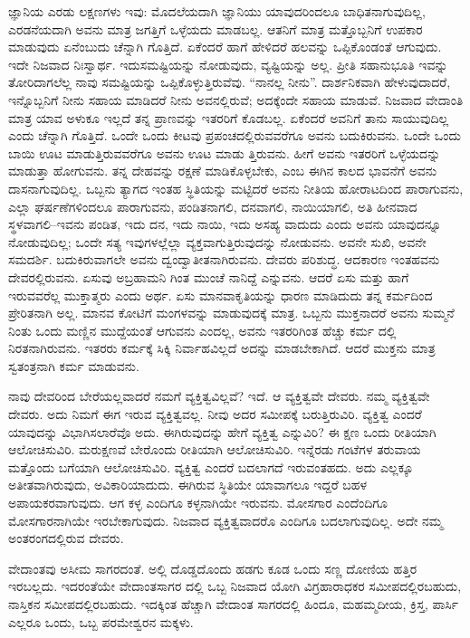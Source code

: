 ಜ್ಞಾನಿಯ ಎರಡು ಲಕ್ಷಣಗಳು ಇವು: ಮೊದಲೆಯದಾಗಿ ಜ್ಞಾನಿಯು ಯಾವುದರಿಂದಲೂ ಬಾಧಿತನಾಗುವುದಿಲ್ಲ, ಎರಡನೆಯದಾಗಿ ಅವನು ಮಾತ್ರ ಜಗತ್ತಿಗೆ ಒಳ್ಳೆಯದು ಮಾಡಬಲ್ಲ. ಆತನಿಗೆ ಮಾತ್ರ ಮತ್ತೊಬ್ಬನಿಗೆ ಉಪಕಾರ ಮಾಡುವುದು ಏನೆಂಬುದು ಚೆನ್ನಾಗಿ ಗೊತ್ತಿದೆ. ಏಕೆಂದರೆ ಹಾಗೆ ಹೇಳಿದರೆ ಹಲವನ್ನು ಒಪ್ಪಿಕೊಂಡಂತೆ ಆಗುವುದು. ಇದೇ ನಿಜವಾದ ನಿಃಸ್ವಾರ್ಥ. ಇದುಸಮಷ್ಟಿಯನ್ನು ನೋಡುವುದು, ವ್ಯಷ್ಟಿಯನ್ನು ಅಲ್ಲ. ಪ್ರೀತಿ ಸಹಾನುಭೂತಿ ಇವನ್ನು ತೋರಿದಾಗಲೆಲ್ಲ ನಾವು ಸಮಷ್ಟಿಯನ್ನು ಒಪ್ಪಿಕೊಳ್ಳುತ್ತಿರುವೆವು. “ನಾನಲ್ಲ ನೀನು”. ದಾರ್ಶನಿಕವಾಗಿ ಹೇಳುವುದಾದರೆ, ಇನ್ನೊಬ್ಬನಿಗೆ ನೀನು ಸಹಾಯ ಮಾಡಿದರೆ ನೀನು ಅವನಲ್ಲಿರುವೆ; ಅದಕ್ಕೆಂದೇ ಸಹಾಯ ಮಾಡುವೆ. ನಿಜವಾದ ವೇದಾಂತಿ ಮಾತ್ರ ಯಾವ ಅಳುಕೂ ಇಲ್ಲದೆ ತನ್ನ ಪ್ರಾಣವನ್ನು ಇತರರಿಗೆ ಕೊಡಬಲ್ಲ. ಏಕೆಂದರೆ ಅವನಿಗೆ ತಾನು ಸಾಯುವುದಿಲ್ಲ ಎಂದು ಚೆನ್ನಾಗಿ ಗೊತ್ತಿದೆ. ಒಂದೇ ಒಂದು ಕೀಟವು ಪ್ರಪಂಚದಲ್ಲಿರುವವರೆಗೂ ಅವನು ಬದುಕಿರುವನು. ಒಂದೇ ಒಂದು ಬಾಯಿ ಊಟ ಮಾಡುತ್ತಿರುವವರೆಗೂ ಅವನು ಊಟ ಮಾಡು ತ್ತಿರುವನು. ಹೀಗೆ ಅವನು ಇತರರಿಗೆ ಒಳ್ಳೆಯದನ್ನು ಮಾಡುತ್ತಾ ಹೋಗುವನು. ತನ್ನ ದೇಹವನ್ನು ರಕ್ಷಣೆ ಮಾಡಿಕೊಳ್ಳಬೇಕು, ಎಂಬ ಈಗಿನ ಕಾಲದ ಭಾವನೆಗೆ ಅವನು ದಾಸನಾಗುವುದಿಲ್ಲ. ಒಬ್ಬನು ತ್ಯಾಗದ ಇಂತಹ ಸ್ಥಿತಿಯನ್ನು ಮಟ್ಟಿದರೆ ಅವನು ನೀತಿಯ ಹೋರಾಟದಿಂದ ಪಾರಾಗುವನು, ಎಲ್ಲಾ ಘರ್ಷಣೆಗಳಿಂದಲೂ ಪಾರಾಗುವನು, ಪಂಡಿತನಾಗಲಿ, ದನವಾಗಲಿ, ನಾಯಿಯಾಗಲಿ, ಅತಿ ಹೀನವಾದ ಸ್ಥಳವಾಗಲಿ–ಇವನು ಪಂಡಿತ, ಇದು ದನ, ಇದು ನಾಯಿ, ಇದು ಅಸಹ್ಯ ವಾದುದು ಎಂದು ಅವನು ಯಾವುದನ್ನೂ ನೋಡುವುದಿಲ್ಲ; ಒಂದೇ ಸತ್ಯ ಇವುಗಳಲ್ಲೆಲ್ಲಾ ವ್ಯಕ್ತವಾಗುತ್ತಿರುವುದನ್ನು ನೋಡುವನು. ಅವನೇ ಸುಖಿ, ಅವನೇ ಸಮದರ್ಶಿ. ಬದುಕಿರುವಾಗಲೇ ಅವನು ದ್ವಂದ್ವಾತೀತನಾಗಿರುವನು. ದೇವರು ಪರಿಶುದ್ಧ. ಆದಕಾರಣ ಇಂತಹವನು ದೇವರಲ್ಲಿರುವನು. ಏಸುವು ಅಬ್ರಹಾಮನಿ ಗಿಂತ ಮುಂಚೆ ನಾನಿದ್ದೆ ಎನ್ನುವನು. ಆದರೆ ಏಸು ಮತ್ತು ಹಾಗೆ ಇರುವವರೆಲ್ಲ ಮುಕ್ತಾತ್ಮರು ಎಂದು ಅರ್ಥ. ಏಸು ಮಾನವಾಕೃತಿಯನ್ನು ಧಾರಣ ಮಾಡಿದುದು ತನ್ನ ಕರ್ಮದಿಂದ ಪ್ರೇರಿತನಾಗಿ ಅಲ್ಲ. ಮಾನವ ಕೋಟಿಗೆ ಮಂಗಳವನ್ನು ಮಾಡುವುದಕ್ಕೆ ಮಾತ್ರ. ಒಬ್ಬನು ಮುಕ್ತನಾದರೆ ಅವನು ಸುಮ್ಮನೆ ನಿಂತು ಒಂದು ಮಣ್ಣಿನ ಮುದ್ದೆಯಂತೆ ಆಗುವನು ಎಂದಲ್ಲ, ಅವನು ಇತರರಿಗಿಂತ ಹೆಚ್ಚು ಕರ್ಮ ದಲ್ಲಿ ನಿರತನಾಗಿರುವನು. ಇತರರು ಕರ್ಮಕ್ಕೆ ಸಿಕ್ಕಿ ನಿರ್ವಾಹವಿಲ್ಲದೆ ಅದನ್ನು ಮಾಡಬೇಕಾಗಿದೆ. ಆದರೆ ಮುಕ್ತನು ಮಾತ್ರ ಸ್ವತಂತ್ರನಾಗಿ ಕರ್ಮ ಮಾಡುವನು.

ನಾವು ದೇವರಿಂದ ಬೇರೆಯಲ್ಲವಾದರೆ ನಮಗೆ ವ್ಯಕ್ತಿತ್ವವಿಲ್ಲವೆ? ಇದೆ. ಆ ವ್ಯಕ್ತಿತ್ವವೇ ದೇವರು. ನಮ್ಮ ವ್ಯಕ್ತಿತ್ವವೇ ದೇವರು. ಅದು ನಿಮಗೆ ಈಗ ಇರುವ ವ್ಯಕ್ತಿತ್ವವಲ್ಲ. ನೀವು ಅದರ ಸಮೀಪಕ್ಕೆ ಬರುತ್ತಿರುವಿರಿ. ವ್ಯಕ್ತಿತ್ವ ಎಂದರೆ ಯಾವುದನ್ನು ವಿಭಾಗಿಸಲಾರೆವೊ ಅದು. ಈಗಿರುವುದನ್ನು ಹೇಗೆ ವ್ಯಕ್ತಿತ್ವ ಎನ್ನುವಿರಿ? ಈ ಕ್ಷಣ ಒಂದು ರೀತಿಯಾಗಿ ಆಲೋಚಿಸುವಿರಿ. ಮರುಕ್ಷಣವೆ ಬೇರೊಂದು ರೀತಿಯಾಗಿ ಆಲೋಚಿಸುವಿರಿ. ಇನ್ನೆರಡು ಗಂಟೆಗಳ ತರುವಾಯ ಮತ್ತೊಂದು ಬಗೆಯಾಗಿ ಆಲೋಚಿಸುವಿರಿ. ವ್ಯಕ್ತಿತ್ವ ಎಂದರೆ ಬದಲಾಗದೆ ಇರುವಂತಹದು. ಅದು ಎಲ್ಲಕ್ಕೂ ಅತೀತವಾಗಿರುವುದು, ಅವಿಕಾರಿಯಾದುದು. ಈಗಿರುವ ಸ್ಥಿತಿಯೇ ಯಾವಾಗಲೂ ಇದ್ದರೆ ಬಹಳ ಅಪಾಯಕರವಾಗುವುದು. ಆಗ ಕಳ್ಳ ಎಂದಿಗೂ ಕಳ್ಳನಾಗಿಯೇ ಇರುವನು. ಮೋಸಗಾರ ಎಂದೆಂದಿಗೂ ಮೋಸಗಾರನಾಗಿಯೇ ಇರಬೇಕಾಗುವುದು. ನಿಜವಾದ ವ್ಯಕ್ತಿತ್ವವಾದರೊ ಎಂದಿಗೂ ಬದಲಾಗುವುದಿಲ್ಲ. ಅದೇ ನಮ್ಮ ಅಂತರಂಗದಲ್ಲಿರುವ ದೇವರು.

ವೇದಾಂತವು ಅಸೀಮ ಸಾಗರದಂತೆ. ಅಲ್ಲಿ ದೊಡ್ಡದೊಂದು ಹಡಗು ಕೂಡ ಒಂದು ಸಣ್ಣ ದೋಣಿಯ ಹತ್ತಿರ ಇರಬಲ್ಲದು. ಇದರಂತೆಯೇ ವೇದಾಂತಸಾಗರ ದಲ್ಲಿ ಒಬ್ಬ ನಿಜವಾದ ಯೋಗಿ ವಿಗ್ರಹಾರಾಧಕರ ಸಮೀಪದಲ್ಲಿರಬಹುದು, ನಾಸ್ತಿಕನ ಸಮೀಪದಲ್ಲಿರಬಹುದು. ಇದಕ್ಕಿಂತ ಹೆಚ್ಚಾಗಿ ವೇದಾಂತ ಸಾಗರದಲ್ಲಿ ಹಿಂದೂ, ಮಹಮ್ಮದೀಯ, ಕ್ರಿಸ್ತ, ಪಾರ್ಸಿ ಎಲ್ಲರೂ ಒಂದು, ಒಬ್ಬ ಪರಮೇಶ್ವರನ ಮಕ್ಕಳು.

